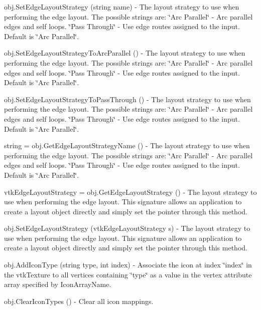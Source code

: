 \begin{DoxyItemize}
\item {\ttfamily obj.\-Set\-Edge\-Layout\-Strategy (string name)} -\/ The layout strategy to use when performing the edge layout. The possible strings are\-: \char`\"{}\-Arc Parallel\char`\"{} -\/ Arc parallel edges and self loops. \char`\"{}\-Pass Through\char`\"{} -\/ Use edge routes assigned to the input. Default is \char`\"{}\-Arc Parallel\char`\"{}.  
\item {\ttfamily obj.\-Set\-Edge\-Layout\-Strategy\-To\-Arc\-Parallel ()} -\/ The layout strategy to use when performing the edge layout. The possible strings are\-: \char`\"{}\-Arc Parallel\char`\"{} -\/ Arc parallel edges and self loops. \char`\"{}\-Pass Through\char`\"{} -\/ Use edge routes assigned to the input. Default is \char`\"{}\-Arc Parallel\char`\"{}.  
\item {\ttfamily obj.\-Set\-Edge\-Layout\-Strategy\-To\-Pass\-Through ()} -\/ The layout strategy to use when performing the edge layout. The possible strings are\-: \char`\"{}\-Arc Parallel\char`\"{} -\/ Arc parallel edges and self loops. \char`\"{}\-Pass Through\char`\"{} -\/ Use edge routes assigned to the input. Default is \char`\"{}\-Arc Parallel\char`\"{}.  
\item {\ttfamily string = obj.\-Get\-Edge\-Layout\-Strategy\-Name ()} -\/ The layout strategy to use when performing the edge layout. The possible strings are\-: \char`\"{}\-Arc Parallel\char`\"{} -\/ Arc parallel edges and self loops. \char`\"{}\-Pass Through\char`\"{} -\/ Use edge routes assigned to the input. Default is \char`\"{}\-Arc Parallel\char`\"{}.  
\item {\ttfamily vtk\-Edge\-Layout\-Strategy = obj.\-Get\-Edge\-Layout\-Strategy ()} -\/ The layout strategy to use when performing the edge layout. This signature allows an application to create a layout object directly and simply set the pointer through this method.  
\item {\ttfamily obj.\-Set\-Edge\-Layout\-Strategy (vtk\-Edge\-Layout\-Strategy s)} -\/ The layout strategy to use when performing the edge layout. This signature allows an application to create a layout object directly and simply set the pointer through this method.  
\item {\ttfamily obj.\-Add\-Icon\-Type (string type, int index)} -\/ Associate the icon at index \char`\"{}index\char`\"{} in the vtk\-Texture to all vertices containing \char`\"{}type\char`\"{} as a value in the vertex attribute array specified by Icon\-Array\-Name.  
\item {\ttfamily obj.\-Clear\-Icon\-Types ()} -\/ Clear all icon mappings.  

\end{DoxyItemize}
